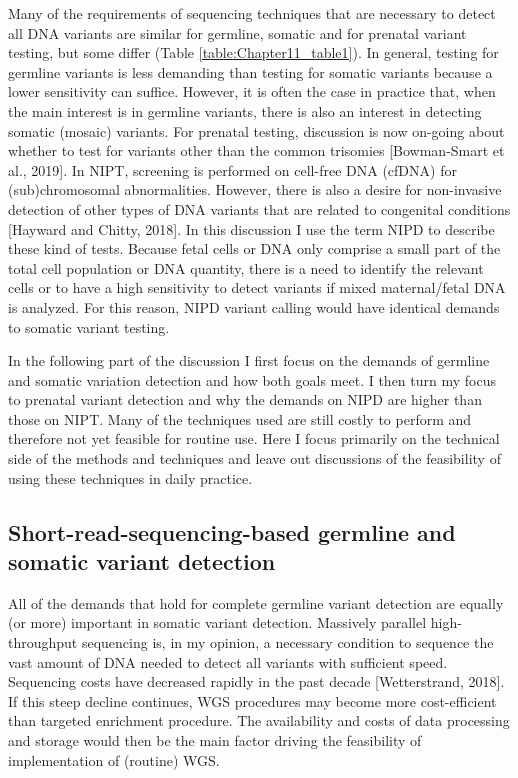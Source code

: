 Many of the requirements of sequencing techniques that are necessary to detect all DNA variants are similar for germline, somatic and for prenatal variant testing, but some differ (Table
\ref{table:Chapter11_table1}). 
In general, testing for germline variants is less demanding than testing for somatic variants because a lower sensitivity can suffice. 
However, it is often the case in practice that, when the main interest is in germline variants, there is also an interest in detecting somatic (mosaic) variants. 
For prenatal testing, discussion is now on-going about whether to test for variants other than the
common trisomies [Bowman-Smart et al., 2019]. In NIPT, screening is performed on cell-free DNA (cfDNA) for (sub)chromosomal abnormalities. 
However, there is also a desire for non-invasive detection of other types of DNA variants that are related to congenital conditions [Hayward and Chitty, 2018]. 
In this discussion I use the term NIPD to describe these kind of tests. 
Because fetal cells or DNA only comprise a small part of the total cell population or DNA quantity, there is a need to identify the relevant cells or to have a high sensitivity to detect variants if mixed maternal/fetal DNA is analyzed. 
For this reason, NIPD variant calling would have identical demands to somatic variant testing.

In the following part of the discussion I first focus on the demands of germline and somatic variation detection and how both goals meet. 
I then turn my focus to prenatal variant detection and why the demands on NIPD are higher than those on NIPT. 
Many of the techniques used are still costly to perform and therefore not yet feasible for routine use. 
Here I focus primarily on the technical side of the methods and techniques and leave out discussions of the feasibility of using these techniques in daily practice.


\subsection{Short-read-sequencing-based germline and somatic variant detection}
All of the demands that hold for complete germline variant detection are equally (or more) important in somatic variant detection. 
Massively parallel high-throughput sequencing is, in my opinion, a necessary condition to sequence the vast amount of DNA needed to detect all variants with sufficient speed. 
Sequencing costs have decreased rapidly in the past decade [Wetterstrand, 2018]. 
If this steep decline continues, WGS procedures may become more cost-efficient than targeted enrichment procedure. 
The availability and costs of data processing and storage would then be the main factor driving the feasibility of implementation of (routine) WGS. 

